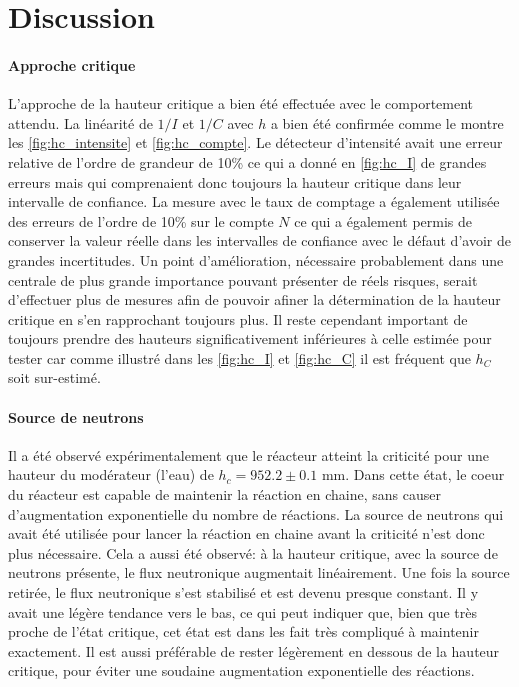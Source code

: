 \section{Discussion}

\paragraph{Approche critique}
L'approche de la hauteur critique a bien été effectuée avec le comportement attendu. La linéarité de $1/I$ et $1/C$ avec $h$ a bien été confirmée comme le montre les \autoref{fig:hc_intensite} et \autoref{fig:hc_compte}. Le détecteur d'intensité avait une erreur relative de l'ordre de grandeur de 10\% ce qui a donné en \autoref{fig:hc_I} de grandes erreurs mais qui comprenaient donc toujours la hauteur critique dans leur intervalle de confiance. La mesure avec le taux de comptage a également utilisée des erreurs de l'ordre de 10\% sur le compte $N$ ce qui a également permis de conserver la valeur réelle dans les intervalles de confiance avec le défaut d'avoir de grandes incertitudes. Un point d'amélioration, nécessaire probablement dans une centrale de plus grande importance pouvant présenter de réels risques, serait d'effectuer plus de mesures afin de pouvoir afiner la détermination de la hauteur critique en s'en rapprochant toujours plus. Il reste cependant important de toujours prendre des hauteurs significativement inférieures à celle estimée pour tester car comme illustré dans les \autoref{fig:hc_I} et \autoref{fig:hc_C} il est fréquent que $h_C$ soit sur-estimé.

\paragraph{Source de neutrons}
Il a été observé expérimentalement que le réacteur atteint la criticité pour une hauteur du modérateur (l'eau) de \(h_c = 952.2 \pm 0.1\) mm. Dans cette état, le coeur du réacteur est capable de maintenir la réaction en chaine, sans causer d'augmentation exponentielle du nombre de réactions. La source de neutrons qui avait été utilisée pour lancer la réaction en chaine avant la criticité n'est donc plus nécessaire. Cela a aussi été observé: à la hauteur critique, avec la source de neutrons présente, le flux neutronique augmentait linéairement. Une fois la source retirée, le flux neutronique s'est stabilisé et est devenu presque constant. Il y avait une légère tendance vers le bas, ce qui peut indiquer que, bien que très proche de l'état critique, cet état est dans les fait très compliqué à maintenir exactement. Il est aussi préférable de rester légèrement en dessous de la hauteur critique, pour éviter une soudaine augmentation exponentielle des réactions.

